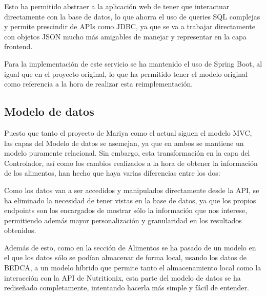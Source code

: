 Esto ha permitido abstraer a la aplicación web de tener que interactuar directamente con la base de datos, lo que ahorra el uso de queries SQL complejas y permite prescindir de APIs como JDBC, ya que se va a trabajar directamente con objetos JSON mucho más amigables de manejar y representar en la capa frontend.

Para la implementación de este servicio se ha mantenido el uso de Spring Boot, al igual que en el proyecto original, lo que ha permitido tener el modelo original como referencia a la hora de realizar esta reimplementación.

\subsection{Modelo de datos}

Puesto que tanto el proyecto de Mariya como el actual siguen el modelo MVC, las capas del Modelo de datos se asemejan, ya que en ambos se mantiene un modelo puramente relacional. Sin embargo, esta transformación en la capa del Controlador, así como los cambios realizados a la hora de obtener la información de los alimentos, han hecho que haya varias diferencias entre los dos:


Como los datos van a ser accedidos y manipulados directamente desde la API, se ha eliminado la necesidad de tener vistas en la base de datos, ya que los propios endpoints son los encargados de mostrar sólo la información que nos interese, permitiendo además mayor personalización y granularidad en los resultados obtenidos.

Además de esto, como en la sección de Alimentos se ha pasado de un modelo en el que los datos sólo se podían almacenar de forma local, usando los datos de BEDCA, a un modelo híbrido que permite tanto el almacenamiento local como la interacción con la API de Nutritionix, esta parte del modelo de datos se ha rediseñado completamente, intentando hacerla más simple y fácil de entender.

